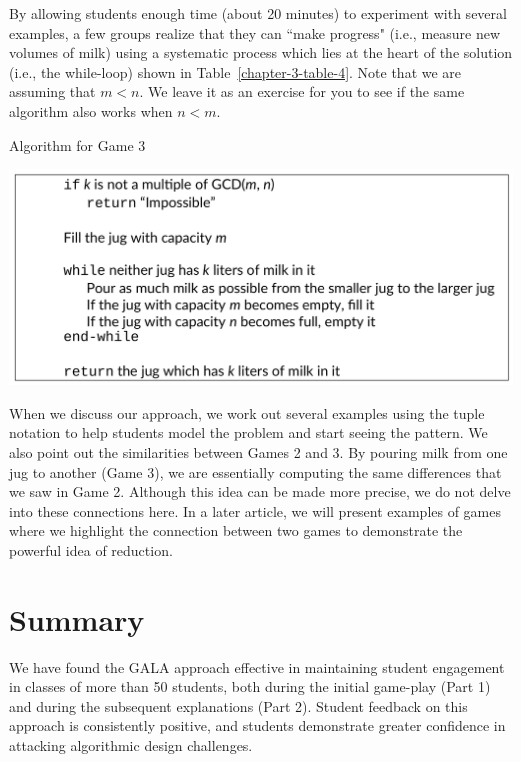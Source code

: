 \begin{multicols}{2}
By allowing students enough time (about 20 minutes) to experiment with several examples, a few groups realize that they can ``make progress" (i.e., measure new volumes of milk) using a systematic process which lies at the heart of the solution (i.e., the while-loop) shown in Table~\ref{chapter-3-table-4}. Note that we are assuming that $m < n$. We leave it as an exercise for you to see if the same algorithm also works when $n < m$.

\begin{table}[H]

\vspace{-.3cm}

\centering
\caption{Algorithm for Game 3}\label{chapter-3-table-4}
\includegraphics[scale=.6]{src/Figures/chap3/table4.jpg}
\end{table}

\vspace{-.5cm}

When we discuss our approach, we work out several examples using the tuple notation to help students model the problem and start seeing the pattern. We also point out the similarities between Games 2 and 3. By pouring milk from one jug to another (Game 3), we are essentially computing the same differences that we saw in Game 2. Although this idea can be made more precise, we do not delve into these connections here. In a later article, we will present examples of games where we highlight the connection between two games to demonstrate the powerful idea of reduction.

\vspace{-.3cm}

\section{Summary}

\vspace{-.2cm}

We have found the GALA approach effective in maintaining student engagement in classes of more than 50 students, both during the initial game-play (Part 1) and during the subsequent explanations (Part 2). Student feedback on this approach is consistently positive, and students demonstrate greater confidence in attacking algorithmic design challenges.


\end{multicols}
